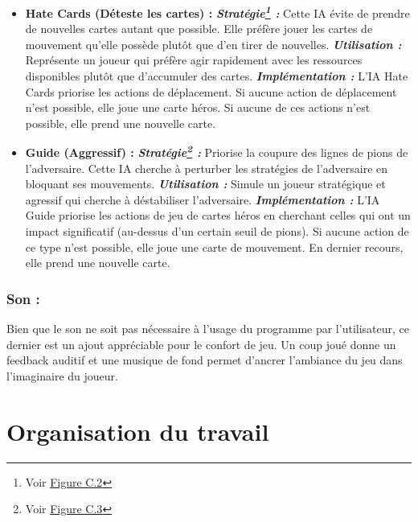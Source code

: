 \begin{itemize}
	\item \textbf{Hate Cards (Déteste les cartes) :}
        \subitem \textbf{\emph{Stratégie\footnote{Voir \hyperref[fig:hate1]{Figure C.2}} :}} Cette IA évite de prendre de nouvelles cartes autant que possible. Elle préfère jouer les cartes de mouvement qu'elle possède plutôt que d'en tirer de nouvelles.
		\subitem \textbf{\emph{Utilisation :}} Représente un joueur qui préfère agir rapidement avec les ressources disponibles plutôt que d'accumuler des cartes.
		\subitem \textbf{\emph{Implémentation :}} L'IA Hate Cards priorise les actions de déplacement. Si aucune action de déplacement n'est possible, elle joue une carte héros. Si aucune de ces actions n'est possible, elle prend une nouvelle carte.\\
	\item \textbf{Guide (Aggressif) :}
		\subitem \textbf{\emph{Stratégie\footnote{Voir \hyperref[fig:guide1]{Figure C.3}} :}} Priorise la coupure des lignes de pions de l'adversaire. Cette IA cherche à perturber les stratégies de l'adversaire en bloquant ses mouvements.
		\subitem \textbf{\emph{Utilisation :}} Simule un joueur stratégique et agressif qui cherche à déstabiliser l'adversaire.
		\subitem \textbf{\emph{Implémentation :}} L'IA Guide priorise les actions de jeu de cartes héros en cherchant celles qui ont un impact significatif (au-dessus d'un certain seuil de pions). Si aucune action de ce type n'est possible, elle joue une carte de mouvement. En dernier recours, elle prend une nouvelle carte.
\end{itemize}


\subsubsection*{Son :}
Bien que le son ne soit pas nécessaire à l’usage du programme par l’utilisateur, ce dernier est un ajout appréciable pour le confort de jeu. Un coup joué donne un feedback auditif et une musique de fond permet d’ancrer l’ambiance du jeu dans l’imaginaire du joueur.

\section{Organisation du travail}

